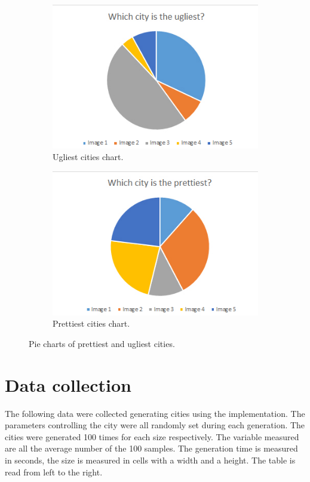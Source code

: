 	\begin{figure}[h]
		\begin{subfigure}{0.5\textwidth}
			\centering
			\includegraphics[width=0.9\linewidth]{"Images/Ugliest"}
			\caption{Ugliest cities chart.}
			\label{fig:pie-chart-ugly}
		\end{subfigure}
		\begin{subfigure}{0.5\textwidth}
			\centering
			\includegraphics[width=0.9\linewidth]{"Images/Prettiest"}
			\caption{Prettiest cities chart.}
			\label{fig:pie-chart-pretty}
		\end{subfigure}
		\caption{Pie charts of prettiest and ugliest cities.}
		\label{fig:pie-chart-ugly-pretty}
	\end{figure}


\section{Data collection}
	The following data were collected generating cities using the implementation. The parameters controlling the city were all randomly set during each generation. The cities were generated 100 times for each size respectively. The variable measured are all the average number of the 100 samples. The generation time is measured in seconds, the size is measured in cells with a width and a height. The table is read from left to the right.
	
